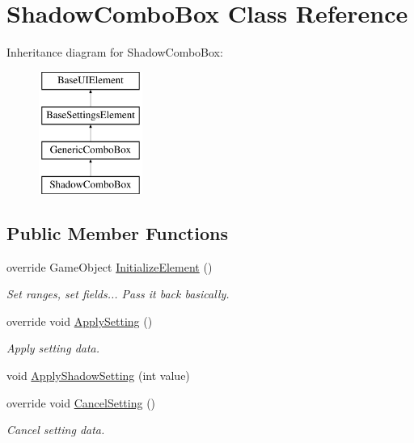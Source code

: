 \hypertarget{class_shadow_combo_box}{}\section{Shadow\+Combo\+Box Class Reference}
\label{class_shadow_combo_box}
Inheritance diagram for Shadow\+Combo\+Box\+:\begin{figure}[H]
\begin{center}
\leavevmode
\includegraphics[height=4.000000cm]{class_shadow_combo_box}
\end{center}
\end{figure}
\subsection*{Public Member Functions}
\begin{DoxyCompactItemize}
\item 
override Game\+Object \hyperlink{class_shadow_combo_box_ae74c360bfe5007aa56efd66e1d016a74}{Initialize\+Element} ()
\begin{DoxyCompactList}\small\item\em Set ranges, set fields... Pass it back basically. \end{DoxyCompactList}\item 
override void \hyperlink{class_shadow_combo_box_a9289f25b57e2935f1b971ec9875218d8}{Apply\+Setting} ()
\begin{DoxyCompactList}\small\item\em Apply setting data. \end{DoxyCompactList}\item 
void \hyperlink{class_shadow_combo_box_aa498ebcfff0a339d139a99216113f913}{Apply\+Shadow\+Setting} (int value)
\item 
override void \hyperlink{class_shadow_combo_box_a8ab8daef08695bae23b99fd41ce1f6c1}{Cancel\+Setting} ()
\begin{DoxyCompactList}\small\item\em Cancel setting data. \end{DoxyCompactList}\end{DoxyCompactItemize}

